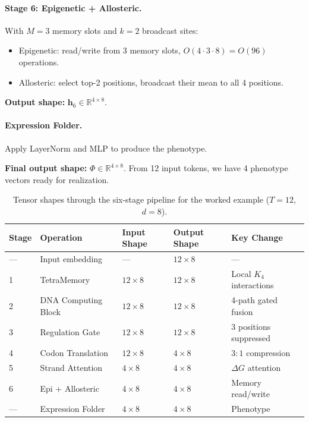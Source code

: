 \begin{example}
\paragraph{Stage 6: Epigenetic + Allosteric.}
With $M = 3$ memory slots and $k = 2$ broadcast sites:
\begin{itemize}[leftmargin=1.5em]
  \item Epigenetic: read/write from 3 memory slots, $O(4 \cdot 3 \cdot 8) = O(96)$ operations.
  \item Allosteric: select top-2 positions, broadcast their mean to all 4 positions.
\end{itemize}

\textbf{Output shape:} $\mathbf{h}_6 \in \mathbb{R}^{4 \times 8}$.

\paragraph{Expression Folder.}
Apply LayerNorm and MLP to produce the phenotype.

\textbf{Final output shape:} $\Phi \in \mathbb{R}^{4 \times 8}$. From 12 input tokens, we have 4 phenotype vectors ready for realization.
\end{example}

\begin{table}[H]
\centering
\caption{Tensor shapes through the six-stage pipeline for the worked example ($T=12$, $d=8$).}
\label{tab:shape-trace}
\renewcommand{\arraystretch}{1.15}
\begin{tabularx}{\textwidth}{C{1cm} L{3.5cm} C{2.5cm} C{2cm} Y}
\toprule
\textbf{Stage} & \textbf{Operation} & \textbf{Input Shape} & \textbf{Output Shape} & \textbf{Key Change} \\
\midrule
--- & Input embedding & --- & $12 \times 8$ & --- \\
1 & TetraMemory & $12 \times 8$ & $12 \times 8$ & Local $K_4$ interactions \\
2 & DNA Computing Block & $12 \times 8$ & $12 \times 8$ & 4-path gated fusion \\
3 & Regulation Gate & $12 \times 8$ & $12 \times 8$ & 3 positions suppressed \\
4 & Codon Translation & $12 \times 8$ & $4 \times 8$ & $3:1$ compression \\
5 & Strand Attention & $4 \times 8$ & $4 \times 8$ & $\Delta G$ attention \\
6 & Epi + Allosteric & $4 \times 8$ & $4 \times 8$ & Memory read/write \\
--- & Expression Folder & $4 \times 8$ & $4 \times 8$ & Phenotype \\
\bottomrule
\end{tabularx}
\end{table}

